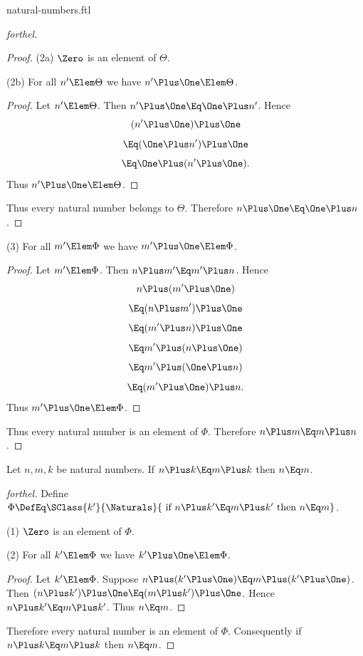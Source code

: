\documentclass{stex}
\begin{document}
\begin{smodule}{natural-numbers.ftl}
\begin{proof}[forthel]
\begin{proof}
    (2a) $\Zero$ is an element of $\Theta$.

    (2b) For all $n' \Elem \Theta$ we have $n' \Plus \One \Elem \Theta$.
    \begin{proof}
      Let $n' \Elem \Theta$.
      Then $n' \Plus \One \Eq \One \Plus n'$.
      Hence
      \[  (n' \Plus \One) \Plus \One        \]
      \[    \Eq (\One \Plus n') \Plus \One    \]
      \[    \Eq \One \Plus (n' \Plus \One).   \]
      Thus $n' \Plus \One \Elem \Theta$.
    \end{proof}

    Thus every natural number belongs to $\Theta$.
    Therefore $n \Plus \One \Eq \One \Plus n$.
  \end{proof}

  (3) For all $m' \Elem \Phi$ we have $m' \Plus \One \Elem \Phi$.
  \begin{proof}
    Let $m' \Elem \Phi$.
    Then $n \Plus m' \Eq m' \Plus n$.
    Hence
    \[  n \Plus (m'  \Plus \One)       \]
    \[    \Eq (n \Plus m') \Plus \One    \]
    \[    \Eq (m' \Plus n) \Plus \One    \]
    \[    \Eq m' \Plus (n \Plus \One)    \]
    \[    \Eq m' \Plus (\One \Plus n)    \]
    \[    \Eq (m' \Plus \One) \Plus n.   \]
    Thus $m' \Plus \One \Elem \Phi$.
  \end{proof}

  Thus every natural number is an element of $\Phi$.
  Therefore $n \Plus m \Eq m \Plus n$.
\end{proof}

\begin{proposition*}[forthel,name=right-cancellability of addition]
  Let $n, m, k$ be natural numbers.
  If $n \Plus k \Eq m \Plus k$ then $n \Eq m$.
\end{proposition*}
\begin{proof}[forthel]
  Define $\Phi \DefEq \SClass{k'}{\Naturals}{\text{ if }n \Plus k' \Eq m \Plus k'\text{ then }n \Eq m}$.

  (1) $\Zero$ is an element of $\Phi$.

  (2) For all $k' \Elem \Phi$ we have $k' \Plus \One \Elem \Phi$.
  \begin{proof}
    Let $k' \Elem \Phi$.
    Suppose $n \Plus (k' \Plus \One) \Eq m \Plus (k' \Plus \One)$.
    Then $(n \Plus k') \Plus \One \Eq (m \Plus k') \Plus \One$.
    Hence $n \Plus k' \Eq m \Plus k'$.
    Thus $n \Eq m$.
  \end{proof}

  Therefore every natural number is an element of $\Phi$.
  Consequently if $n \Plus k \Eq m \Plus k$ then $n \Eq m$.
\end{proof}


\end{smodule}
\end{document}
